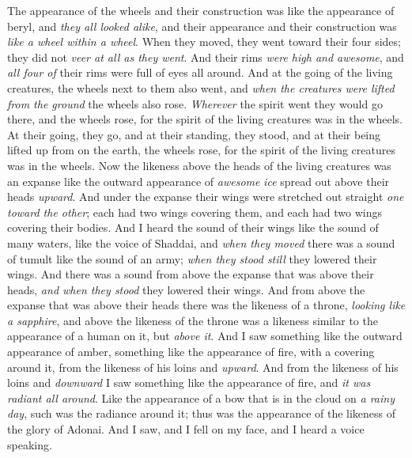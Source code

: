 \begin{biblechapter}
\verse The appearance of the wheels and their construction was like the appearance of beryl, and \textit{they all looked alike}, and their appearance and their construction was \textit{like a wheel within a wheel}.
\verse When they moved, they went toward their four sides; they did not \textit{veer at all as they went}.
\verse And their rims \textit{were high and awesome}, and \textit{all four of} their rims were full of eyes all around.
\verse And at the going of the living creatures, the wheels next to them also went, and \textit{when the creatures were lifted from the ground} the wheels also rose.
\verse \textit{Wherever} the spirit went they would go there, and the wheels rose, for the spirit of the living creatures was in the wheels.
\verse At their going, they go, and at their standing, they stood, and at their being lifted up from on the earth, the wheels rose, for the spirit of the living creatures was in the wheels.
\verse Now the likeness above the heads of the living creatures was an expanse like the outward appearance of \textit{awesome} \textit{ice} spread out above their heads \textit{upward}.
\verse And under the expanse their wings were stretched out straight \textit{one toward the other}; each had two wings covering them, and each had two wings covering their bodies.
\verse And I heard the sound of their wings like the sound of many waters, like the voice of Shaddai, and \textit{when they moved} there was a sound of tumult like the sound of an army; \textit{when they stood still} they lowered their wings.
\verse And there was a sound from above the expanse that was above their heads, \textit{and when they stood} they lowered their wings.
\verse And from above the expanse that was above their heads there was the likeness of a throne, \textit{looking like a sapphire}, and above the likeness of the throne was a likeness similar to the appearance of a human on it, but \textit{above it}.
\verse And I saw something like the outward appearance of amber, something like the appearance of fire, with a covering around it, from the likeness of his loins and \textit{upward}. And from the likeness of his loins and \textit{downward} I saw something like the appearance of fire, and \textit{it was radiant all around}.
\verse Like the appearance of a bow that is in the cloud on \textit{a rainy day}, such was the radiance around it; thus was the appearance of the likeness of the glory of Adonai. And I saw, and I fell on my face, and I heard a voice speaking.
\end{biblechapter}


